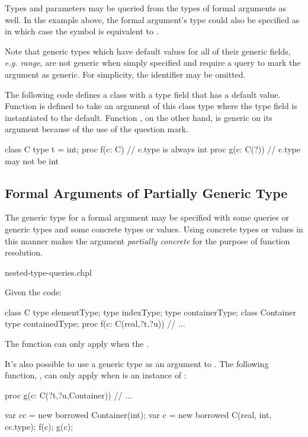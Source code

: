Types and parameters may be queried from the types of formal
arguments as well.  In the example above, the formal argument's type
could also be specified as  in which case the
symbol  is equivalent to .

Note that generic types which have default values for all of their
generic fields, \emph{e.g. range}, are not generic when simply
specified and require a query to mark the argument as generic.  For
simplicity, the identifier may be omitted.
\begin{example}
The following code defines a class with a type field that has a
default value.  Function  is defined to take an argument of
this class type where the type field is instantiated to the default.
Function , on the other hand, is generic on its argument
because of the use of the question mark.
\begin{chapel}
class C {
  type t = int;
}
proc f(c: C) {
  // c.type is always int
}
proc g(c: C(?)) {
  // c.type may not be int
}
\end{chapel}
\end{example}

\subsection{Formal Arguments of Partially Generic Type}
\label{Formal_Arguments_of_Partially_Generic_Type}

The generic type for a formal argument may be specified with some queries
or generic types and some concrete types or values.
Using concrete types or values in this manner makes the argument
\emph{partially concrete} for the purpose of function resolution.

\begin{chapelexample}{nested-type-queries.chpl}

Given the code:
\begin{chapel}
class C {
  type elementType;
  type indexType;
  type containerType;
}
class Container {
  type containedType;
}
proc f(c: C(real,?t,?u)) {
  // ...
}
\end{chapel}

The function  can only apply when the .

It's also possible to use a generic type as an argument to . The
following function, , can only apply when  is
an instance of :

\begin{chapel}
proc g(c: C(?t,?u,Container)) {
  // ...
}
\end{chapel}

\begin{chapelpost}
var cc = new borrowed Container(int);
var c = new borrowed C(real, int, cc.type);
f(c);
g(c);
\end{chapelpost}
\begin{chapeloutput}
\end{chapeloutput}
\end{chapelexample}


